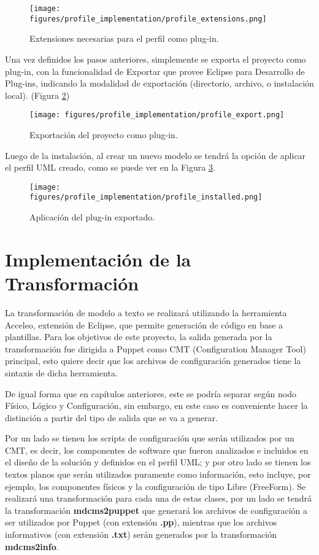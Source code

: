 \begin{figure}[H]
    \centering
    \texttt{[image: figures/profile\_implementation/profile\_extensions.png]}
    \caption{Extensiones necesarias para el perfil como plug-in.}
    \label{fig:profile:extensions}
\end{figure}

Una vez definidos los pasos anteriores, simplemente se exporta el proyecto como plug-in, con la funcionalidad de Exportar que provee Eclipse para Desarrollo de Plug-ins, indicando la modalidad de exportación (directorio, archivo, o instalación local). (Figura \ref{fig:profile:plugin_export})

\begin{figure}[H]
    \centering
    \texttt{[image: figures/profile\_implementation/profile\_export.png]}
    \caption{Exportación del proyecto como plug-in.}
    \label{fig:profile:plugin_export}
\end{figure}

Luego de la instalación, al crear un nuevo modelo se tendrá la opción de aplicar el perfil UML creado, como se puede ver en la Figura \ref{fig:profile:apply}.

\begin{figure}[htbp]
    \centering
    \texttt{[image: figures/profile\_implementation/profile\_installed.png]}
    \caption{Aplicación del plug-in exportado.}
    \label{fig:profile:apply}
\end{figure}

\section{Implementación de la Transformación}

La transformación de modelo a texto se realizará utilizando la herramienta Acceleo, extensión de Eclipse, que permite generación de código en base a plantillas. Para los objetivos de este proyecto, la salida generada por la transformación fue dirigida a Puppet como CMT (Configuration Manager Tool) principal, esto quiere decir que los archivos de configuración generados tiene la sintaxis de dicha herramienta.

De igual forma que en capítulos anteriores, este se podría separar según nodo Físico, Lógico y Configuración, sin embargo, en este caso es conveniente hacer la distinción a partir del tipo de salida que se va a generar. 

Por un lado se tienen los scripts de configuración que serán utilizados por un CMT, es decir, los componentes de software que fueron analizados e incluidos en el diseño de la solución y definidos en el perfil UML; y por otro lado se tienen los textos planos que serán utilizados puramente como información, esto incluye, por ejemplo, los componentes físicos y la configuración de tipo Libre (FreeForm). 
Se realizará una transformación para cada una de estas clases, por un lado se tendrá la transformación \textbf{mdcms2puppet} que generará los archivos de configuración a ser utilizados por Puppet (con extensión \textbf{.pp}), mientras que los archivos informativos (con extensión \textbf{.txt}) serán generados por la transformación \textbf{mdcms2info}.

